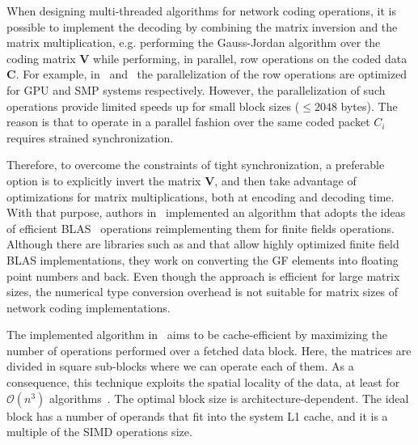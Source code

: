 When designing multi-threaded algorithms for network coding operations, it is
possible to implement the decoding by combining the matrix inversion and the
matrix multiplication, e.g. performing the Gauss-Jordan algorithm over the
coding matrix $\textbf{V}$ while performing, in parallel, row operations on the
coded data $\textbf{C}$. For example, in~\cite{5061951} and~\cite{4262451} the
parallelization of the row operations are optimized for \ac{GPU} and \ac{SMP}
systems respectively. However, the parallelization of such operations provide
limited speeds up for small block sizes ($\leq 2048$ bytes). The reason is that
to operate in a parallel fashion over the same coded packet $C_i$ requires
strained synchronization.

Therefore, to overcome the constraints of tight synchronization, a
preferable option is to explicitly invert the matrix $\textbf{V}$, and then
take advantage of optimizations for matrix multiplications, both at
encoding and decoding time. With that purpose, authors
in~\cite{wunderlich2015network} implemented an algorithm that adopts
the ideas of efficient \ac{BLAS}~\cite{lawson1979basic} operations
reimplementing them for finite fields operations. Although there are
libraries such as \cite{dumas2008dense} and \cite{dumas2002linbox} that allow
highly optimized finite field \ac{BLAS} implementations, they work on
converting the \ac{GF} elements into floating point numbers and back.
Even though the approach is efficient for large matrix sizes, the
numerical type conversion overhead is not suitable for matrix sizes of
network coding implementations.

The implemented algorithm in~\cite{wunderlich2015network} aims to be
cache-efficient by maximizing the number of operations performed over a
fetched data block. Here, the matrices are divided in square sub-blocks
where we can operate each of them. As a consequence, this technique
exploits the spatial locality of the data, at least for
$\mathcal{O}(n^3)$ algorithms~\cite{golub2012matrix}. The optimal block
size is architecture-dependent. The ideal block has a number of operands
that fit into the system L1 cache, and it is a multiple of the \ac{SIMD}
operations size.

